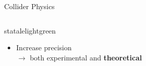 \begin{frame} {Collider Physics}
\begin{columns}
\begin{column}{0.5\textwidth}
        \begin{colorblock}[black]{statalelightgreen}{}
        \begin{itemize}
          \item Increase precision  \\$\to$ both experimental and \textbf{theoretical}
        \end{itemize}
      \end{colorblock}
    
    \end{column}

    \end{columns}
  
\end{frame}



